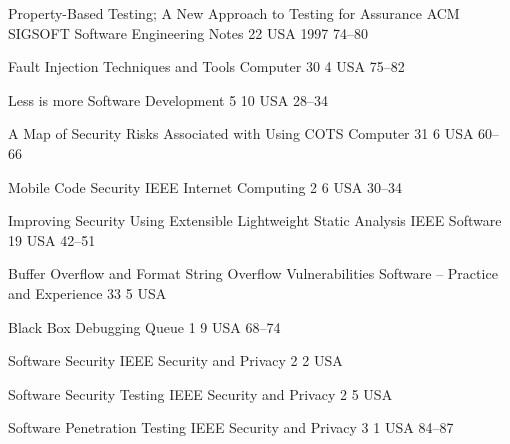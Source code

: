 \begin{thebibliography}{9}
		{
			\BibAnd
			}
		{Property-Based Testing; A New Approach to Testing for Assurance}
		{ACM SIGSOFT Software Engineering Notes}
		{22}
		{}
		{USA}
		{1997}
		{74--80}
	
		{
			\BibAnd
			\BibAnd
			}
		{Fault Injection Techniques and Tools}
		{Computer}
		{30}
		{4}
		{USA}
		{}
		{75--82}
	
		{}
		{Less is more}
		{Software Development}
		{5}
		{10}
		{USA}
		{}
		{28--34}
	
		{
			\BibAnd
			}
		{A Map of Security Risks Associated with Using {COTS}}
		{Computer}
		{31}
		{6}
		{USA}
		{}
		{60--66}
	
		{
			\BibAnd
			}
		{Mobile Code Security}
		{{IEEE} Internet Computing}
		{2}
		{6}
		{USA}
		{}
		{30--34}
	
		{
			\BibAnd
			}
		{Improving Security Using Extensible Lightweight Static Analysis}
		{{IEEE} Software}
		{19}
		{}
		{USA}
		{}
		{42--51}
	
		{
			\BibAnd
			}
		{Buffer Overflow and Format String Overflow Vulnerabilities}
		{Software -- Practice and Experience}
		{33}
		{5}
		{USA}
		{}
		{}
	
		{
			\BibAnd
			}
		{Black Box Debugging}
		{Queue}
		{1}
		{9}
		{USA}
		{}
		{68--74}

		{}
		{Software Security}
		{{IEEE} Security and Privacy}
		{2}
		{2}
		{USA}
		{}
		{}
	
		{
			\BibAnd
			}
		{Software Security Testing}
		{{IEEE} Security and Privacy}
		{2}
		{5}
		{USA}
		{}
		{}
	
		{
			\BibAnd
			\BibAnd
			}
		{Software Penetration Testing}
		{{IEEE} Security and Privacy}
		{3}
		{1}
		{USA}
		{}
		{84--87}
	

\end{thebibliography}
